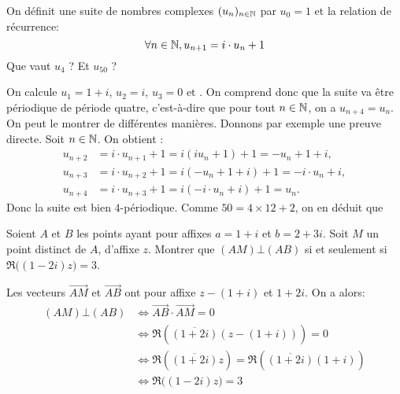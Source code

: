 \begin{exo}
On définit une suite de nombres complexes $(u_n)_{n\in\mathbb{N}}$ par $u_0=1$ et la relation de récurrence:
\[\forall n\in\mathbb{N}, u_{n+1}=i\cdot u_n+1\]
Que vaut $u_4$ ? Et $u_{50}$ ? 
\begin{sol}
On calcule $u_1=1+i$, $u_2=i$, $u_3=0$ et .
On comprend donc que la suite va être périodique de période quatre, c'est-à-dire  que pour tout  $n\in\mathbb{N}$, on a  $u_{n+4}=u_n$. On peut le montrer de différentes manières. Donnons par exemple une preuve directe. Soit $n\in\mathbb{N}$. On obtient :
\begin{align*}
u_{n+2} &= i\cdot u_{n+1}+1=i(i u_n+1)+1=-u_n+1+i,\\
u_{n+3} &= i\cdot u_{n+2}+1=i(-u_n+1+i)+1=-i\cdot u_n+i,\\
u_{n+4} &= i\cdot u_{n+3}+1=i(-i\cdot u_n+i)+1=u_n.
\end{align*}
Donc la suite est bien $4$-périodique. Comme $50=4\times12 + 2$, on en déduit que 
\end{sol}
\end{exo}



\begin{exo}
Soient $A$ et $B$ les points ayant pour affixes  $a=1+i$ et $b=2+3i$. Soit $M$ un point distinct de $A$, d'affixe $z$. 
Montrer que $(AM) \bot (AB)$ si et seulement si  $\Re\big( (1-2i)z \big)=3$.
\begin{sol}
Les vecteurs $\overrightarrow{AM}$ et $\overrightarrow{AB}$ ont pour affixe $z-(1+i)$ et $1+2i$. On a alors:
\begin{align*}
(AM) \bot (AB)
&\iff \overrightarrow{AB}\cdot \overrightarrow{AM}=0\\
&\iff \Re(\overline{(1+2i)}(z-(1+i)))=0\\
&\iff \Re(\overline{(1+2i)}z) = \Re(\overline{(1+2i)}(1+i))\\
&\iff \Re\big( (1-2i)z \big)=3
\end{align*}
\end{sol}
\end{exo}

